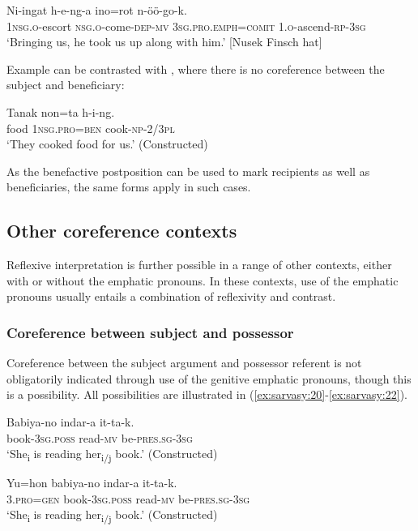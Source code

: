 \documentclass[output=paper,colorlinks,citecolor=brown]{langscibook}
\begin{document}
\ea%
    \label{ex:sarvasy:18}
    \gll    Ni-ingat   h-e-ng-a     ino=rot     n-öö-go-k.\\
            \textsc{1nsg.o}{}-escort  \textsc{nsg.o}{}-come-\textsc{dep-mv}  \textsc{3sg.pro.emph=comit}  \textsc{1.o-}ascend-\textsc{rp-3sg}\\
    \glt    ‘Bringing us, he took us up along with him.’ [Nusek Finsch hat]
\z

Example  can be contrasted with , where there is no coreference between the subject and beneficiary:

\ea%
    \label{ex:sarvasy:19}
    \gll    Tanak   non=ta      h-i-ng.\\
            food  \textsc{1nsg.pro=ben}  cook-\textsc{np-2/3pl}\\
    \glt    ‘They cooked food for us.’ (Constructed)
\z

As the benefactive postposition can be used to mark recipients as well as beneficiaries, the same forms apply in such cases. 

\subsection{Other coreference contexts}\label{sec:sarvasy:3.3}

Reflexive interpretation is further possible in a range of other contexts, either with or without the emphatic pronouns. In these contexts, use of the emphatic pronouns usually entails a combination of reflexivity and contrast.

\subsubsection{Coreference between subject and possessor}\label{sec:sarvasy:3.3.1}

Coreference between the subject argument and possessor referent is not obligatorily indicated through use of the genitive emphatic pronouns, though this is a possibility. All possibilities are illustrated in (\ref{ex:sarvasy:20}-\ref{ex:sarvasy:22}). 

\ea%
    \label{ex:sarvasy:20}
    \gll    Babiya-no  indar-a    it-ta-k.\\
            book-\textsc{3sg.poss}  read-\textsc{mv}  be-\textsc{pres.sg-3sg}\\
    \glt    ‘She\textsubscript{i} is reading her\textsubscript{i/j} book.’ (Constructed)
\z

\ea%
    \label{ex:sarvasy:21}
    \gll    Yu=hon  babiya-no  indar-a    it-ta-k.\\
            \textsc{3.pro=gen}  book-\textsc{3sg.poss}  read-\textsc{mv}  be-\textsc{pres.sg-3sg}\\
    \glt    ‘She\textsubscript{i} is reading her\textsubscript{i/j} book.’ (Constructed)
\z
\end{document}
